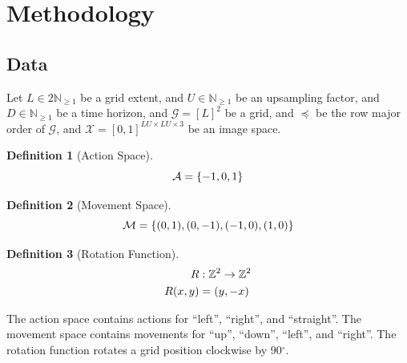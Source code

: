 \documentclass[10pt, twocolumn]{article}
\theoremstyle{definition}
\newtheorem{definition}{Definition}
\theoremstyle{remark}
\newcommand{\N}{\mathbb{N}}
\newcommand{\Z}{\mathbb{Z}}
\begin{document}
\section{Methodology}

\subsection{Data}

Let $L\in 2\N_{\geq 1}$ be a grid extent,
and $U\in\N_{\geq 1}$ be an upsampling factor,
and $D\in\N_{\geq 1}$ be a time horizon,
and $\mathcal{G}=[L]^{2}$ be a grid,
and $\preceq$ be the row major order of $\mathcal{G}$,
and $\mathcal{X}=[0,1]^{LU\times LU\times 3}$ be an image space.

\begin{definition}[Action Space]
$$
	\mathcal{A}
    =
    \mleft\{-1,0,1\mright\}
$$
\end{definition}

\begin{definition}[Movement Space]
$$
	\mathcal{M}
	=
	\mleft\{(0,1),(0,-1),(-1,0),(1,0)\mright\}
$$
\end{definition}

\begin{definition}[Rotation Function]
\begin{align*}
	R&:\Z^{2}\to\Z^{2}
	\\
	R\mleft(x,y\mright)
    &=
    \mleft(y,-x\mright)
\end{align*}
\end{definition}

The action space contains actions for ``left'', ``right'', and ``straight''.
The movement space contains movements for ``up'', ``down'', ``left'', and ``right''.
The rotation function rotates a grid position clockwise by 90$^{\circ}$.
\end{document}
